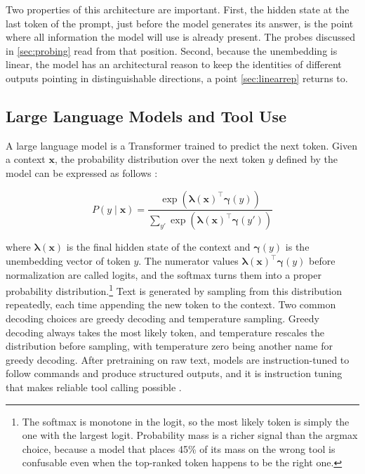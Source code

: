 Two properties of this architecture are important.
First, the hidden state at the last token of the prompt, just before the model generates its answer, is the point where all information the model will use is already present.
The probes discussed in \cref{sec:probing} read from that position.
Second, because the unembedding is linear, the model has an architectural reason to keep the identities of different outputs pointing in distinguishable directions, a point \cref{sec:linearrep} returns to.

\subsection{Large Language Models and Tool Use}
\label{sec:llmtools}

A large language model is a Transformer trained to predict the next token.
Given a context $\mathbf{x}$, the probability distribution over the next token $y$ defined by the model can be expressed as follows \cite[p.~2]{park2024linear}:

\begin{equation}
P(y \mid \mathbf{x}) = \frac{\exp(\boldsymbol{\lambda}(\mathbf{x})^\top \boldsymbol{\gamma}(y))}{\sum_{y'} \exp(\boldsymbol{\lambda}(\mathbf{x})^\top \boldsymbol{\gamma}(y'))}
\label{eq:softmax}
\end{equation}

where $\boldsymbol{\lambda}(\mathbf{x})$ is the final hidden state of the context and $\boldsymbol{\gamma}(y)$ is the unembedding vector of token $y$.
The numerator values $\boldsymbol{\lambda}(\mathbf{x})^\top \boldsymbol{\gamma}(y)$ before normalization are called logits, and the softmax turns them into a proper probability distribution.\footnote{The softmax is monotone in the logit, so the most likely token is simply the one with the largest logit. Probability mass is a richer signal than the argmax choice, because a model that places 45\% of its mass on the wrong tool is confusable even when the top-ranked token happens to be the right one.}
Text is generated by sampling from this distribution repeatedly, each time appending the new token to the context.
Two common decoding choices are greedy decoding and temperature sampling.
Greedy decoding always takes the most likely token, and temperature rescales the distribution before sampling, with temperature zero being another name for greedy decoding.
After pretraining on raw text, models are instruction-tuned to follow commands and produce structured outputs, and it is instruction tuning that makes reliable tool calling possible \cite{schick2023toolformer}.
\\

